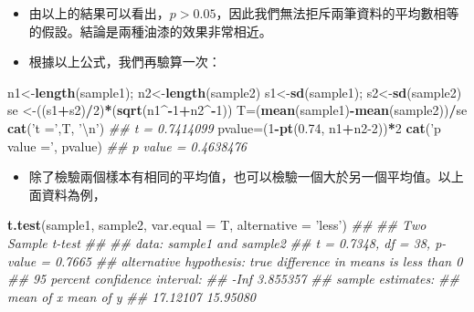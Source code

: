 \documentclass[hyperref,]{ctexart}
\newenvironment{Shaded}{\begin{snugshade}}{\end{snugshade}}
\newcommand{\CharTok}[1]{\textcolor[rgb]{0.31,0.60,0.02}{#1}}
\newcommand{\CommentTok}[1]{\textcolor[rgb]{0.56,0.35,0.01}{\textit{#1}}}
\newcommand{\DataTypeTok}[1]{\textcolor[rgb]{0.13,0.29,0.53}{#1}}
\newcommand{\DecValTok}[1]{\textcolor[rgb]{0.00,0.00,0.81}{#1}}
\newcommand{\FloatTok}[1]{\textcolor[rgb]{0.00,0.00,0.81}{#1}}
\newcommand{\KeywordTok}[1]{\textcolor[rgb]{0.13,0.29,0.53}{\textbf{#1}}}
\newcommand{\NormalTok}[1]{#1}
\newcommand{\OperatorTok}[1]{\textcolor[rgb]{0.81,0.36,0.00}{\textbf{#1}}}
\newcommand{\StringTok}[1]{\textcolor[rgb]{0.31,0.60,0.02}{#1}}
\providecommand{\tightlist}{%
  \setlength{\itemsep}{0pt}\setlength{\parskip}{0pt}}
\begin{document}
\begin{itemize}
\item
  由以上的結果可以看出，\(p>0.05\)，因此我們無法拒斥兩筆資料的平均數相等的假設。結論是兩種油漆的效果非常相近。
\item
  根據以上公式，我們再驗算一次：
\end{itemize}

\begin{Shaded}
\begin{Highlighting}[]
\NormalTok{n1<-}\KeywordTok{length}\NormalTok{(sample1); n2<-}\KeywordTok{length}\NormalTok{(sample2)}
\NormalTok{s1<-}\KeywordTok{sd}\NormalTok{(sample1); s2<-}\KeywordTok{sd}\NormalTok{(sample2)}
\NormalTok{se <-((s1}\OperatorTok{+}\NormalTok{s2)}\OperatorTok{/}\DecValTok{2}\NormalTok{)}\OperatorTok{*}\NormalTok{(}\KeywordTok{sqrt}\NormalTok{(n1}\OperatorTok{^-}\DecValTok{1}\OperatorTok{+}\NormalTok{n2}\OperatorTok{^-}\DecValTok{1}\NormalTok{))}
\NormalTok{T=(}\KeywordTok{mean}\NormalTok{(sample1)}\OperatorTok{-}\KeywordTok{mean}\NormalTok{(sample2))}\OperatorTok{/}\NormalTok{se}
\KeywordTok{cat}\NormalTok{(}\StringTok{'t ='}\NormalTok{,T, }\StringTok{'}\CharTok{\textbackslash{}n}\StringTok{'}\NormalTok{)}
\CommentTok{## t = 0.7414099}
\NormalTok{pvalue=(}\DecValTok{1}\OperatorTok{-}\KeywordTok{pt}\NormalTok{(}\FloatTok{0.74}\NormalTok{, n1}\OperatorTok{+}\NormalTok{n2}\DecValTok{-2}\NormalTok{))}\OperatorTok{*}\DecValTok{2}
\KeywordTok{cat}\NormalTok{(}\StringTok{'p value ='}\NormalTok{, pvalue)}
\CommentTok{## p value = 0.4638476}
\end{Highlighting}
\end{Shaded}

\begin{itemize}
\tightlist
\item
  除了檢驗兩個樣本有相同的平均值，也可以檢驗一個大於另一個平均值。以上面資料為例，
\end{itemize}

\begin{Shaded}
\begin{Highlighting}[]
 \KeywordTok{t.test}\NormalTok{(sample1, sample2, }\DataTypeTok{var.equal =}\NormalTok{ T, }\DataTypeTok{alternative =} \StringTok{'less'}\NormalTok{)}
\CommentTok{## }
\CommentTok{##  Two Sample t-test}
\CommentTok{## }
\CommentTok{## data:  sample1 and sample2}
\CommentTok{## t = 0.7348, df = 38, p-value = 0.7665}
\CommentTok{## alternative hypothesis: true difference in means is less than 0}
\CommentTok{## 95 percent confidence interval:}
\CommentTok{##      -Inf 3.855357}
\CommentTok{## sample estimates:}
\CommentTok{## mean of x mean of y }
\CommentTok{##  17.12107  15.95080}
\end{Highlighting}
\end{Shaded}
\end{document}
